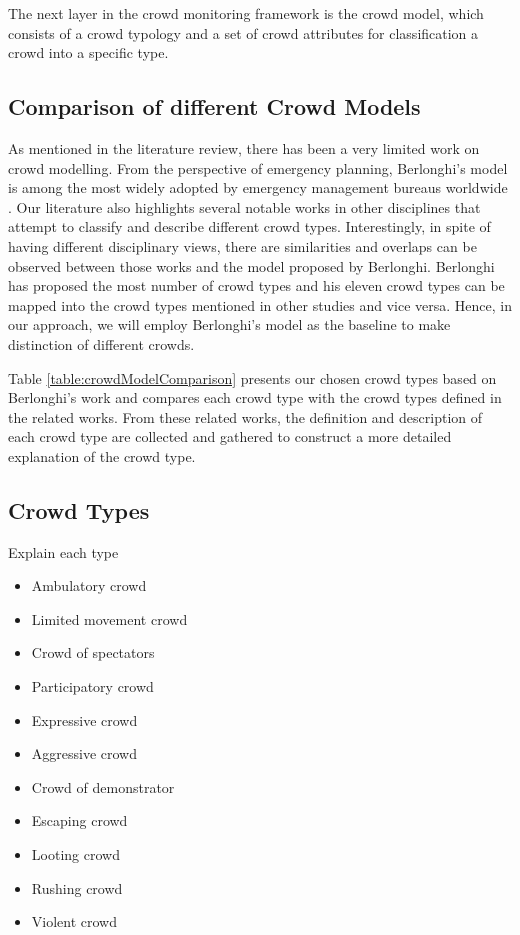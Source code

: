 The next layer in the crowd monitoring framework is the crowd model, which consists of a crowd typology and a set of crowd attributes for classification a crowd into a specific type.

\subsection{Comparison of different Crowd Models}
As mentioned in the literature review, there has been a very limited work on crowd modelling. From the perspective of emergency planning, Berlonghi's model is among the most widely adopted by emergency management bureaus worldwide \citep{FEMA2005, EMA1999}. Our literature also highlights several notable works in other disciplines that attempt to classify and describe different crowd types. Interestingly, in spite of having different disciplinary views, there are similarities and overlaps can be observed between those works and the model proposed by Berlonghi. Berlonghi has proposed the most number of crowd types and his eleven crowd types can be mapped into the crowd types mentioned in other studies and vice versa. Hence, in our approach, we will employ Berlonghi's model as the baseline to make distinction of different crowds.

Table \ref{table:crowdModelComparison} presents our chosen crowd types based on Berlonghi's work and compares each crowd type with the crowd types defined in the related works. From these related works, the definition and description of each crowd type are collected and gathered to construct a more detailed explanation of the crowd type.

\subsection{Crowd Types}
Explain each type
\begin{itemize}
\item Ambulatory crowd
\item Limited movement crowd
\item Crowd of spectators
\item Participatory crowd
\item Expressive crowd
\item Aggressive crowd
\item Crowd of demonstrator
\item Escaping crowd
\item Looting crowd
\item Rushing crowd
\item Violent crowd
\end{itemize}

